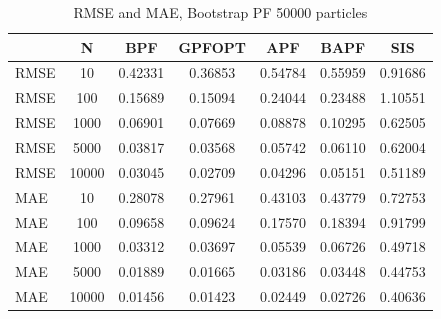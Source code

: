 \documentclass[
]{book}
\theoremstyle{break}
\theoremstyle{nonumberplain}
\begin{document}
\begin{longtable}[t]{lcccccc}
\caption{\label{tab:unnamed-chunk-36}RMSE and MAE, Bootstrap PF 50000 particles}\\
\toprule
  & N & BPF & GPFOPT & APF & BAPF & SIS\\
\midrule
RMSE & 10 & 0.42331 & 0.36853 & 0.54784 & 0.55959 & 0.91686\\
RMSE & 100 & 0.15689 & 0.15094 & 0.24044 & 0.23488 & 1.10551\\
RMSE & 1000 & 0.06901 & 0.07669 & 0.08878 & 0.10295 & 0.62505\\
RMSE & 5000 & 0.03817 & 0.03568 & 0.05742 & 0.06110 & 0.62004\\
RMSE & 10000 & 0.03045 & 0.02709 & 0.04296 & 0.05151 & 0.51189\\
\addlinespace
MAE & 10 & 0.28078 & 0.27961 & 0.43103 & 0.43779 & 0.72753\\
MAE & 100 & 0.09658 & 0.09624 & 0.17570 & 0.18394 & 0.91799\\
MAE & 1000 & 0.03312 & 0.03697 & 0.05539 & 0.06726 & 0.49718\\
MAE & 5000 & 0.01889 & 0.01665 & 0.03186 & 0.03448 & 0.44753\\
MAE & 10000 & 0.01456 & 0.01423 & 0.02449 & 0.02726 & 0.40636\\
\bottomrule
\end{longtable}
\end{document}
